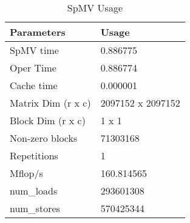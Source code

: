 \begin{table}[htbp]
	\centering	
	\begin{adjustbox}{width=.4\textwidth}
		\small
  \begin{tabular}{ll}
		\toprule
		\textbf{Parameters} & \textbf{Usage} \\
		\midrule
		   SpMV time & 0.886775 \\
		   Oper Time & 0.886774 \\
		   Cache time & 0.000001 \\
		   Matrix Dim (r x c) & 2097152 x 2097152 \\
		   Block Dim (r x c) & 1 x 1 \\
		   Non-zero blocks & 71303168 \\
		   Repetitions & 1 \\
		   Mflop/s & 160.814565 \\
		   num\_loads & 293601308 \\
		   num\_stores & 570425344 \\
		\bottomrule
	\end{tabular}%
\end{adjustbox}%
\caption{SpMV Usage}
\label{ww:101}%
\end{table}%